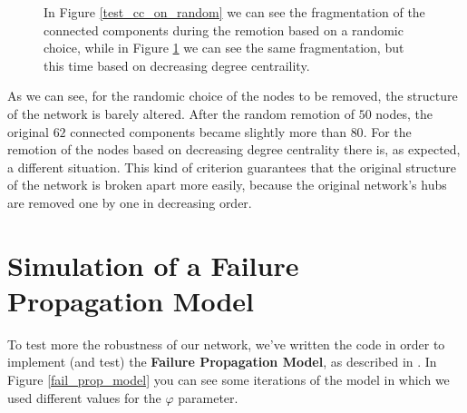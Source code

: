 \begin{figure}[H]
\begin{subfigure}{0.45\textwidth}
{                }
                \caption{}
                \label{test_cc_on_degree_centrality}
            \end{subfigure}
            \caption{In Figure \ref{test_cc_on_random} we can see the fragmentation of the connected components
            during the remotion based on a randomic choice, while in Figure \ref{test_cc_on_degree_centrality} we
            can see the same fragmentation, but this time based on decreasing degree centraility.}
            \label{test_cc}
        \end{figure}

        As we can see, for the randomic choice of the nodes to be removed, the structure of the network is barely
        altered. After the random remotion of $50$ nodes, the original $62$ connected components became slightly
        more than $80$. For the remotion of the nodes based on decreasing degree centrality there is, as expected,
        a different situation. This kind of criterion guarantees that the original structure of the network is
        broken apart more easily, because the original network's hubs are removed one by one in decreasing order.
    \section{Simulation of a Failure Propagation Model} %
    \label{sec:simulation_of_a_failure_propagation_model}
        To test more the robustness of our network, we've written the code in order to implement (and test) the
        \textbf{Failure Propagation Model}, as described in \cite{network_science}. In Figure \ref{fail_prop_model}
        you can see some iterations of the model in which we used different values for the $\varphi$ parameter.

